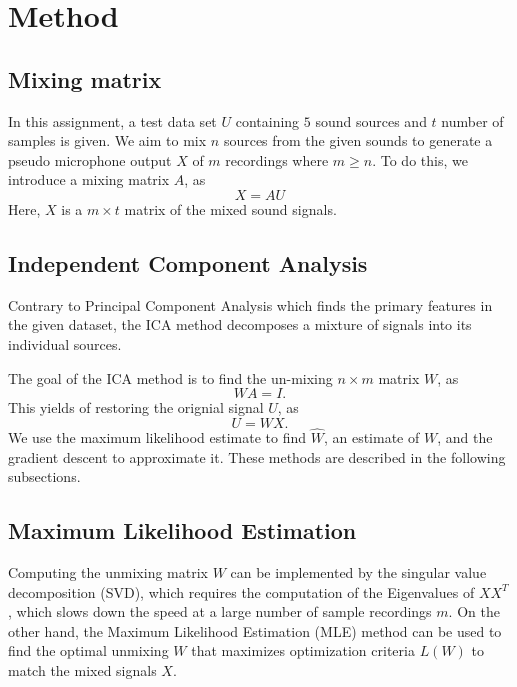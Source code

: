 \documentclass[conference]{IEEEtran}
\begin{document}
\section{Method}
\label{sec:method}

\subsection{Mixing matrix}

In this assignment, a test data set $U$ containing $5$ sound sources and $t$ number of samples is given. We aim to mix $n$ sources from the given sounds to generate a pseudo microphone output $X$ of $m$ recordings where $m\geq n$. To do this, we introduce a mixing matrix $A$, as
\begin{equation}
    X = AU
\end{equation}
Here, $X$ is a $m \times t$ matrix of the mixed sound signals.


\subsection{Independent Component Analysis}

Contrary to Principal Component Analysis which finds the primary features in the given dataset, the ICA method decomposes a mixture of signals into its individual sources. 

The goal of the ICA method is to find the un-mixing $n \times m$ matrix $W$, as
\begin{equation}
    WA = I.
\end{equation}
This yields of restoring the orignial signal $U$, as
\begin{equation}
    U = WX.
\end{equation}
We use the maximum likelihood estimate to find $\hat{W}$, an estimate of $W$, and the gradient descent to approximate it. These methods are described in the following subsections.


\subsection{Maximum Likelihood Estimation}

Computing the unmixing matrix $W$ can be implemented by the singular value decomposition (SVD), which requires the computation of the Eigenvalues of $XX^T$, which slows down the speed at a large number of sample recordings $m$.
On the other hand, the Maximum Likelihood Estimation (MLE) method can be used to find the optimal unmixing $W$ that maximizes optimization criteria $L(W)$ to match the mixed signals $X$.
\end{document}
